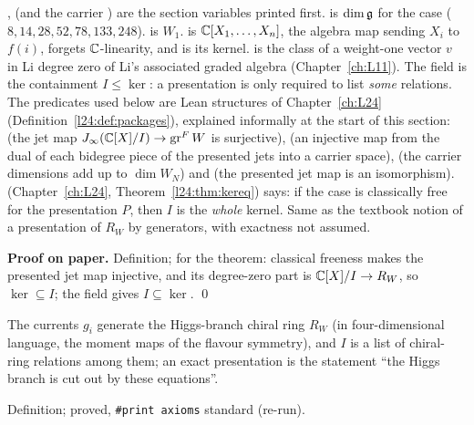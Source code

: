 \begin{dictionary}
,  (and the carrier ) are the section variables printed first.  is
$\dim\mathfrak g$ for the case ($8,14,28,52,78,133,248$).  is $W_1$.  is
${\mathbb{C}}[X_1,\dots,X_n]$,  the algebra map sending $X_i$ to $f(i)$,  forgets ${\mathbb{C}}$-linearity, and
 is its kernel.  is the class of a weight-one vector $v$ in Li degree zero of Li's
associated graded algebra (Chapter~\ref{ch:L11}). The field  is the containment $I\le\ker$: a presentation is only required to
list \emph{some} relations.
The predicates used below are Lean structures of Chapter~\ref{ch:L24} (Definition~\ref{l24:def:packages}), explained informally at the
start of this section:  (the jet map $J_\infty({\mathbb{C}}[X]/I)\to\operatorname{gr}^FW$ is surjective),
 (an injective map from the dual of each bidegree piece of the presented jets into a carrier space),
 (the carrier dimensions add up to $\dim W_N$) and  (the presented
jet map is an isomorphism).  (Chapter~\ref{ch:L24}, Theorem~\ref{l24:thm:kereq}) says: if the case is classically free for the presentation $P$, then $I$ is the \emph{whole} kernel. Same as the textbook
notion of a presentation of $R_W$ by generators, with exactness not assumed.
\end{dictionary}

\textbf{Proof on paper.} Definition; for the theorem: classical freeness makes the presented jet map injective, and its degree-zero
part is ${\mathbb{C}}[X]/I\to R_W$, so $\ker\subseteq I$; the field  gives $I\subseteq\ker$. \qed

\begin{physics}
The currents $g_i$ generate the Higgs-branch chiral ring $R_W$ (in four-dimensional language, the moment maps of the flavour symmetry), and
$I$ is a list of chiral-ring relations among them; an exact presentation is the statement ``the Higgs branch is cut out by these
equations''.
\end{physics}

\begin{status}
Definition;  proved, \texttt{\#print axioms} standard (re-run).
\end{status}

